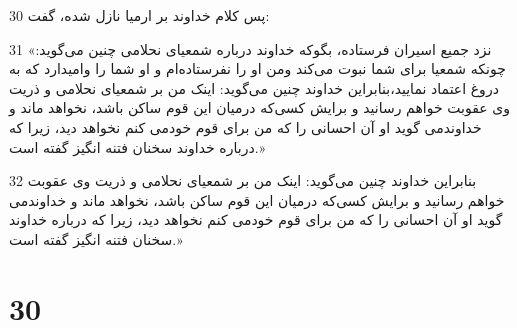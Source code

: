 \par 30 پس کلام خداوند بر ارمیا نازل شده، گفت:
\par 31 «نزد جمیع اسیران فرستاده، بگوکه خداوند درباره شمعیای نحلامی چنین می‌گوید: چونکه شمعیا برای شما نبوت می‌کند ومن او را نفرستاده‌ام و او شما را وامیدارد که به دروغ اعتماد نمایید،بنابراین خداوند چنین می‌گوید: اینک من بر شمعیای نحلامی و ذریت وی عقوبت خواهم رسانید و برایش کسی‌که درمیان این قوم ساکن باشد، نخواهد ماند و خداوندمی گوید او آن احسانی را که من برای قوم خودمی کنم نخواهد دید، زیرا که درباره خداوند سخنان فتنه انگیز گفته است.»
\par 32 بنابراین خداوند چنین می‌گوید: اینک من بر شمعیای نحلامی و ذریت وی عقوبت خواهم رسانید و برایش کسی‌که درمیان این قوم ساکن باشد، نخواهد ماند و خداوندمی گوید او آن احسانی را که من برای قوم خودمی کنم نخواهد دید، زیرا که درباره خداوند سخنان فتنه انگیز گفته است.»
 
\chapter{30}

